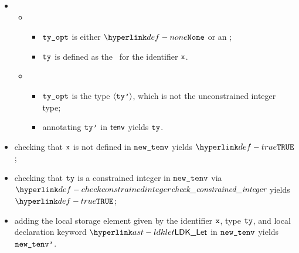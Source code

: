 \ProseParagraph
\AllApply
\begin{itemize}
  \item \OneApplies
  \begin{itemize}
    \item {}
    \begin{itemize}
      \item $\texttt{ty\_opt}$ is either $\None$ or an \unconstrainedintegertype{};
      \item $\texttt{ty}$ is defined as the \parameterizedintegertype\ for the identifier $\texttt{x}$.
    \end{itemize}

    \item {}
    \begin{itemize}
      \item $\texttt{ty\_opt}$ is the type $\langle\texttt{ty'}\rangle$, which is not the unconstrained integer type;
      \item annotating $\texttt{ty'}$ in $\textsf{tenv}$ yields $\texttt{ty}$\ProseOrTypeError.
    \end{itemize}
  \end{itemize}
  \item checking that $\texttt{x}$ is not defined in $\texttt{new\_tenv}$ yields $\True$\ProseOrTypeError;
  \item checking that $\texttt{ty}$ is a constrained integer in $\texttt{new\_tenv}$ via $\checkconstrainedinteger$
        yields $\True$\ProseOrTypeError;
  \item adding the local storage element given by the identifier $\texttt{x}$, type $\texttt{ty}$, and local declaration keyword
        $\LDKLet$ in $\texttt{new\_tenv}$ yields $\texttt{new\_tenv'}$.
\end{itemize}

\FormallyParagraph
{}

